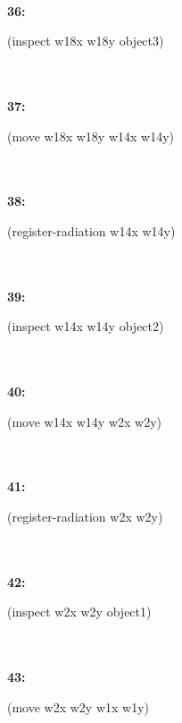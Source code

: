 \documentclass[a4paper,12pt]{article}
\newcommand{\atime}[1]{{\bf #1:}}
\newcommand{\action}[1]{{\sf #1}}
\newcommand{\listrow}[1]{\begin{minipage}[t]{11.5cm} #1 \end{minipage}}
\begin{document}
\begin{tabbing}
\\\atime{36}  \> \listrow{\action{(inspect w18x w18y object3)}}\\
\\\atime{37}  \> \listrow{\action{(move w18x w18y w14x w14y)}}\\
\\\atime{38}  \> \listrow{\action{(register-radiation w14x w14y)}}\\
\\\atime{39}  \> \listrow{\action{(inspect w14x w14y object2)}}\\
\\\atime{40}  \> \listrow{\action{(move w14x w14y w2x w2y)}}\\
\\\atime{41}  \> \listrow{\action{(register-radiation w2x w2y)}}\\
\\\atime{42}  \> \listrow{\action{(inspect w2x w2y object1)}}\\
\\\atime{43}  \> \listrow{\action{(move w2x w2y w1x w1y)}}\\
\end{tabbing}
\end{document}
